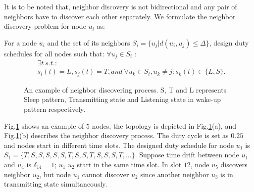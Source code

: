 It is to be noted that, neighbor discovery is not bidirectional and any pair of neighbors have to discover each other separately.
We formulate the neighbor discovery problem for node $u_i$ as:
\begin{problem}
For a node $u_i$ and the set of its neighbors $S_i = \{u_j | d(u_i, u_j)\leq \Delta \}$, design duty schedules for all nodes such that:
$\forall u_j \in S_i$ :
$$
\begin{aligned}
&\exists t \ s.t. :   \\%
&s_i(t) = L ,
s_{j}(t) = T, and~
\forall u_k \in S_i, u_k \neq j : s_{k}(t) \in \{L, S\}.
\end{aligned}
$$
\end{problem}

\begin{figure}[!h]
\centering
{}
\vspace{0.03in}
\caption{An example of neighbor discovering process. S, T and L represents Sleep pattern,
Transmitting state and Listening state in wake-up pattern respectively.}
\label{NDexample}
\end{figure}

Fig.\ref{NDexample} shows an example of $5$ nodes, the topology is depicted in Fig.\ref{NDexample}(a), and Fig.\ref{NDexample}(b) describes the neighbor discovery process. The duty cycle is set as $0.25$ and nodes start in different time slots.
The designed duty schedule for node $u_1$ is $S_1 = \{ T, S, S, S, S, S, T, S, S, T, S, S, S, T, ... \}$.
Suppose time drift between node $u_1$ and $u_4$ is $\delta_{14} = 1$; $u_1$ $u_2$ start in the same time slot. 
In slot $12$, node $u_5$ discovers neighbor $u_2$, but node $u_1$ cannot discover $u_2$ since another neighbor $u_3$ is in transmitting state simultaneously.

